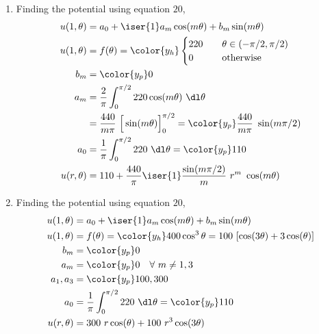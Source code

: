 \begin{enumerate}
    \item Finding the potential using equation $ 20 $,
          \begin{align}
              u(1, \theta) & = a_0 + \iser{1} a_m \cos(m\theta) + b_m \sin(m\theta)  \\
              u(1, \theta) & = f(\theta) = \color{y_h}
              \begin{cases}
                  220 & \quad \theta \in (-\pi/2, \pi/2) \\
                  0   & \quad \text{otherwise}
              \end{cases}                                 \\
              b_m          & = \color{y_p} 0                                         \\
              a_m          & = \frac{2}{\pi} \int_{0}^{\pi/2} 220 \cos(m\theta)
              \ \dl \theta                                                           \\
                           & = \frac{440}{m\pi}\ \Big[\sin(m\theta)\Big]_{0}^{\pi/2}
              = \color{y_p} \frac{440}{m\pi}\ \sin(m\pi/2)                           \\
              a_0          & = \frac{1}{\pi} \int_{0}^{\pi/2} 220\ \dl \theta
              = \color{y_p} 110                                                      \\
              u(r, \theta) & = 110 + \frac{440}{\pi} \iser{1} \frac{\sin(m\pi/2)}{m}
              \ r^m\ \cos(m\theta)
          \end{align}

    \item Finding the potential using equation $ 20 $,
          \begin{align}
              u(1, \theta) & = a_0 + \iser{1} a_m \cos(m\theta) + b_m \sin(m\theta) \\
              u(1, \theta) & = f(\theta) = \color{y_h} 400 \cos^3 \theta
              = 100\ [\cos(3\theta) + 3\cos(\theta)]                                \\
              b_m          & = \color{y_p} 0                                        \\
              a_m          & =  \color{y_p} 0 \quad \forall\ m \neq 1,3             \\
              a_1, a_3     & = \color{y_p}100, 300                                  \\
              a_0          & = \frac{1}{\pi} \int_{0}^{\pi/2} 220\ \dl \theta
              = \color{y_p} 110                                                     \\
              u(r, \theta) & = 300\ r\cos(\theta) + 100\ r^3 \cos(3\theta)
          \end{align}


\end{enumerate}
